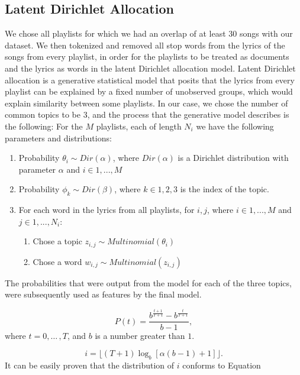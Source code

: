 \documentclass[acmtog, authorversion]{acmart}
\begin{document}
\subsection{Latent Dirichlet Allocation}

We chose all playlists for which we had an overlap of at least 30 songs with our dataset. We then tokenized and removed all stop words from the lyrics of the songs from every playlist, in order for the playlists to be treated as documents and the lyrics as words in the latent Dirichlet allocation model. Latent Dirichlet allocation is a generative statistical model that posits that the lyrics from every playlist can be explained by a fixed number of unobserved groups, which would explain similarity between some playlists. In our case, we chose the number of common topics to be 3, and the process that the generative model describes is the following: \newline
For the $M$ playlists, each of length $N_{i}$ we have the following parameters and distributions:
\begin{enumerate}
  \item Probability $\theta_{i} \sim Dir(\alpha)$, where $Dir(\alpha)$ is a Dirichlet distribution with parameter $\alpha$ and $i \in {1, ..., M}$
  \item Probability $\phi_{k} \sim Dir(\beta)$, where $k \in {1,2,3}$ is the index of the topic.
  \item For each word in the lyrics from all playlists, for $i, j$, where $i \in {1, ..., M}$ and $j \in {1, ..., N_{i}}$:
     \begin{enumerate}
       \item Chose a topic $z_{i, j} \sim Multinomial(\theta_{i})$
       \item Chose a word $w_{i, j} \sim Multinomial(z_{i, j})$
     \end{enumerate}
\end{enumerate}

The probabilities that were output from the model for each of the three topics, were subsequently used as features by the final model.

\begin{equation}
\label{eqn:01}
P(t)=\frac{b^{\frac{t+1}{T+1}}-b^{\frac{t}{T+1}}}{b-1},
\end{equation}
where $t=0,{\ldots}\,,T$, and $b$ is a number greater than $1$.


\[
i=\lfloor(T+1)\log_b[\alpha(b-1)+1]\rfloor.
\]
It can be easily proven that the distribution of $i$ conforms to Equation
\end{document}

